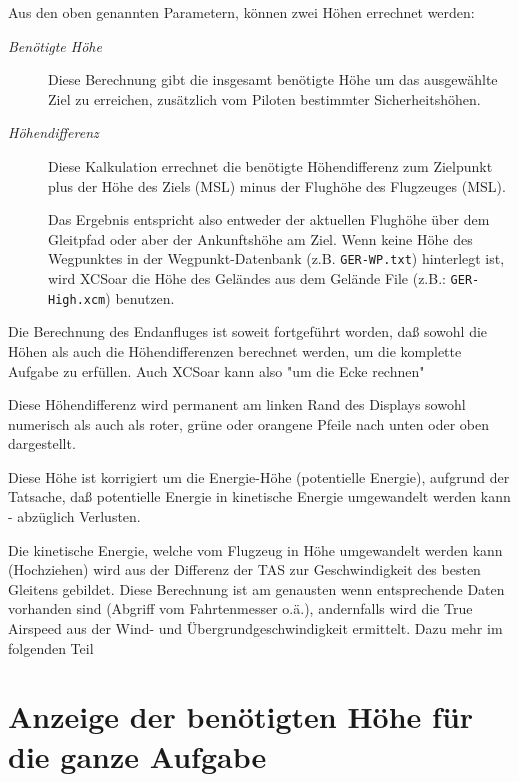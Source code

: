 Aus den oben genannten Parametern, können zwei Höhen errechnet werden:

\begin{description}
\item[\textit{Benötigte Höhe}]
Diese Berechnung gibt die insgesamt benötigte Höhe um das ausgewählte Ziel zu erreichen,
zusätzlich vom Piloten bestimmter Sicherheitshöhen.
\item[\textit{Höhendifferenz}]
Diese Kalkulation errechnet die benötigte Höhendifferenz zum Zielpunkt  plus der Höhe des
Ziels (MSL) minus der Flughöhe des Flugzeuges (MSL).

Das Ergebnis entspricht also entweder der aktuellen Flughöhe über dem Gleitpfad oder aber der Ankunftshöhe am Ziel.
Wenn keine Höhe des Wegpunktes in der Wegpunkt-Datenbank (z.B. \texttt{GER-WP.txt}) hinterlegt ist, wird \textsf{XCSoar}
die Höhe des Geländes aus dem Gelände File (z.B.: \texttt{GER-High.xcm}) benutzen.
\end{description}

Die Berechnung des Endanfluges ist soweit fortgeführt worden, daß sowohl die Höhen als auch die Höhendifferenzen
berechnet werden, um die komplette Aufgabe zu erfüllen. Auch \textsf{XCSoar} kann also "um die Ecke rechnen"

\tip Diese Höhendifferenz wird permanent am linken Rand des Displays sowohl numerisch als auch als roter,
grüne oder orangene  Pfeile nach unten oder oben dargestellt.

Diese Höhe ist korrigiert um die Energie-Höhe (potentielle Energie), aufgrund der Tatsache, daß potentielle
Energie in kinetische Energie umgewandelt werden kann - abzüglich Verlusten.

Die kinetische Energie, welche vom Flugzeug in Höhe umgewandelt werden kann (Hochziehen) wird aus der
Differenz der TAS zur Geschwindigkeit des besten Gleitens gebildet. Diese Berechnung ist am genausten wenn
entsprechende Daten vorhanden sind (Abgriff vom Fahrtenmesser o.ä.), andernfalls wird die True Airspeed
aus der Wind- und Übergrundgeschwindigkeit ermittelt. Dazu mehr im folgenden Teil

\section{Anzeige der benötigten Höhe für die ganze Aufgabe}

